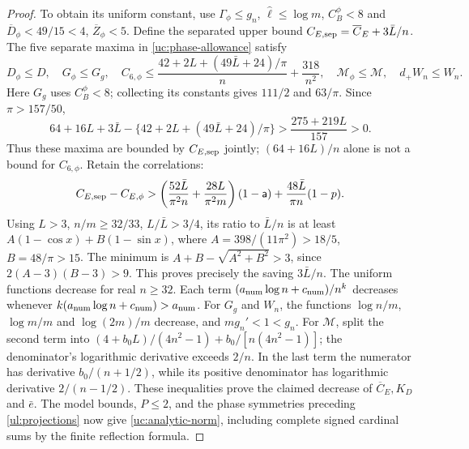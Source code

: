 \begin{proof}
To obtain its uniform constant, use $\Gamma_\phi\leq g_n$,
$\hat{\ell}\leq\log m$, $C_B^\phi<8$ and
$\overline D_\phi<49/15<4$, $\overline Z_\phi<5$.
Define the separated upper bound
$C_{E,{\rm sep}}=\overline C_E+3\bar{L}/n$.
The five separate maxima in \eqref{uc:phase-allowance} satisfy
\[
D_\phi\leq D,\quad G_\phi\leq G_g,\quad
C_{6,\phi}\leq\frac{42+2L+(49\bar L+24)/\pi}{n}+\frac{318}{n^2},
\quad\mathcal M_\phi\leq\mathcal M,\quad d_+W_n\leq W_n.
\]
Here $G_g$ uses $C_B^\phi<8$; collecting its constants gives $111/2$
and $63/\pi$. Since $\pi>157/50$,
\[
64+16L+3\bar L-\{42+2L+(49\bar L+24)/\pi\}
>\frac{275+219L}{157}>0.
\]
Thus these maxima are bounded by $C_{E,{\rm sep}}$ jointly;
$(64+16L)/n$ alone is not a bound for $C_{6,\phi}$.
Retain the correlations:
\[
 C_{E,{\rm sep}}-C_{E,\phi}>
 \left(\frac{52\bar{L}}{\pi^2n}+\frac{28L}{\pi^2m}\right)(1-\mathsf{a})
                +\frac{48\bar{L}}{\pi n}(1-p).
\]
Using $L>3$, $n/m\geq32/33$, $L/\bar{L}>3/4$, its ratio to $\bar{L}/n$
is at least $A(1-\cos x)+B(1-\sin x)$, where
$A=398/(11\pi^2)>18/5$, $B=48/\pi>15$.
The minimum is $A+B-\sqrt{A^2+B^2}>3$, since
$2(A-3)(B-3)>9$. This proves precisely the saving $3\bar{L}/n$.
The uniform functions decrease for real $n\geq32$.
Each term $(a_{\rm num}\log n+c_{\rm num})/n^k$ decreases whenever
$k(a_{\rm num}\log n+c_{\rm num})>a_{\rm num}$. For $G_g$ and $W_n$, the functions
$\log n/m$, $\log m/m$ and $\log(2m)/m$ decrease, and
$mg_n'<1<g_n$. For $\mathcal M$, split the second term into
$(4+b_0L)/(4n^2-1)+b_0/[n(4n^2-1)]$; the denominator's
logarithmic derivative exceeds $2/n$. In the last term the numerator
has derivative $b_0/(n+1/2)$, while its positive denominator has
logarithmic derivative $2/(n-1/2)$. These inequalities prove the
claimed decrease of $\overline C_E,K_D$ and $\bar e$.
The model bounds, $P\leq2$, and the phase symmetries preceding
\eqref{ul:projections} now give
\eqref{uc:analytic-norm}, including complete signed cardinal sums by
the finite reflection formula.


\end{proof}
